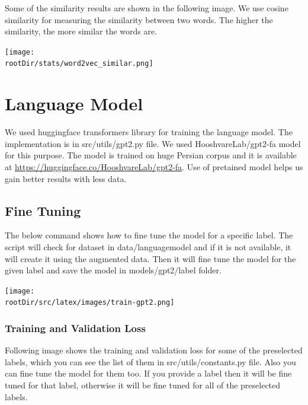 \documentclass[12pt, letterpaper]{article}
\def\rootDir{../..}
\begin{document}
    Some of the similarity results are shown in the following image. We use cosine similarity for measuring the similarity between two words. The higher the similarity, the more similar the words are.
    \begin{center}
        \texttt{[image: \\rootDir/stats/word2vec\_similar.png]}
    \end{center}

    \section{Language Model}\label{sec:language-model}
    We used huggingface transformers library for training the language model. The implementation is in src\slash utils\slash gpt2.py file. We used HooshvareLab/gpt2-fa model for this purpose. The model is trained on huge Persian corpus and it is available at \url{https://huggingface.co/HooshvareLab/gpt2-fa}. Use of pretained model helps us gain better results with less data.
    
    \subsection{Fine Tuning}\label{subsec:fine-tuning-gpt2}
    The below command shows how to fine tune the model for a specific label. The script will check for dataset in data\slash languagemodel and if it is not available, it will create it using the augmented data. Then it will fine tune the model for the given label and save the model in models\slash gpt2\slash label folder.
    \begin{center}
        \texttt{[image: \\rootDir/src/latex/images/train-gpt2.png]}
    \end{center}

    \subsubsection{Training and Validation Loss}\label{subsubsec:training-and-validation-loss}
    Following image shows the training and validation loss for some of the preselected labels, which you can see the list of them in src\slash utils\slash constants.py file. Also you can fine tune the model for them too. If you provide a label then it will be fine tuned for that label, otherwise it will be fine tuned for all of the preselected labels.
    \begin{figure}[H]
        \centering
        
    \end{figure}
\end{document}
